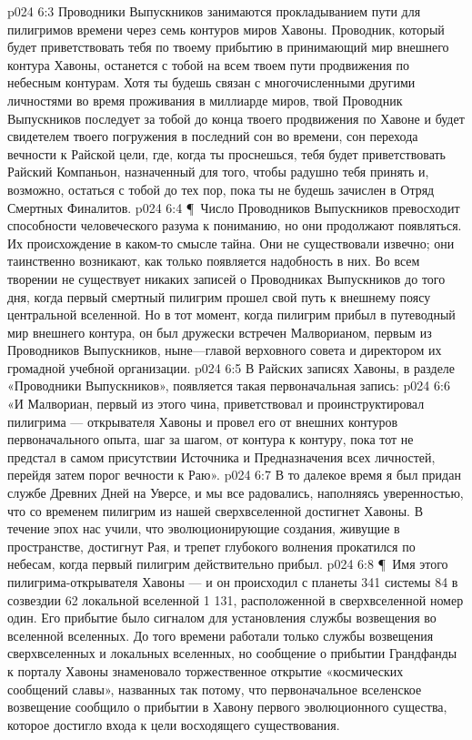 \vs p024 6:3 Проводники Выпускников занимаются прокладыванием пути для пилигримов времени через семь контуров миров Хавоны. Проводник, который будет приветствовать тебя по твоему прибытию в принимающий мир внешнего контура Хавоны, останется с тобой на всем твоем пути продвижения по небесным контурам. Хотя ты будешь связан с многочисленными другими личностями во время проживания в миллиарде миров, твой Проводник Выпускников последует за тобой до конца твоего продвижения по Хавоне и будет свидетелем твоего погружения в последний сон во времени, сон перехода вечности к Райской цели, где, когда ты проснешься, тебя будет приветствовать Райский Компаньон, назначенный для того, чтобы радушно тебя принять и, возможно, остаться с тобой до тех пор, пока ты не будешь зачислен в Отряд Смертных Финалитов.
\vs p024 6:4 \P\ Число Проводников Выпускников превосходит способности человеческого разума к пониманию, но они продолжают появляться. Их происхождение в каком\hyp{}то смысле тайна. Они не существовали извечно; они таинственно возникают, как только появляется надобность в них. Во всем творении не существует никаких записей о Проводниках Выпускников до того дня, когда первый смертный пилигрим прошел свой путь к внешнему поясу центральной вселенной. Но в тот момент, когда пилигрим прибыл в путеводный мир внешнего контура, он был дружески встречен Малворианом, первым из Проводников Выпускников, ныне---главой верховного совета и директором их громадной учебной организации.
\vs p024 6:5 В Райских записях Хавоны, в разделе «Проводники Выпускников», появляется такая первоначальная запись:
\vs p024 6:6 «И Малвориан, первый из этого чина, приветствовал и проинструктировал пилигрима --- открывателя Хавоны и провел его от внешних контуров первоначального опыта, шаг за шагом, от контура к контуру, пока тот не предстал в самом присутствии Источника и Предназначения всех личностей, перейдя затем порог вечности к Раю».
\vs p024 6:7 В то далекое время я был придан службе Древних Дней на Уверсе, и мы все радовались, наполняясь уверенностью, что со временем пилигрим из нашей сверхвселенной достигнет Хавоны. В течение эпох нас учили, что эволюционирующие создания, живущие в пространстве, достигнут Рая, и трепет глубокого волнения прокатился по небесам, когда первый пилигрим действительно прибыл.
\vs p024 6:8 \P\ Имя этого пилигрима\hyp{}открывателя Хавоны ---  и он происходил с планеты 341 системы 84 в созвездии 62 локальной вселенной 1 131, расположенной в сверхвселенной номер один. Его прибытие было сигналом для установления службы возвещения во вселенной вселенных. До того времени работали только службы возвещения сверхвселенных и локальных вселенных, но сообщение о прибытии Грандфанды к порталу Хавоны знаменовало торжественное открытие «космических сообщений славы», названных так потому, что первоначальное вселенское возвещение сообщило о прибытии в Хавону первого эволюционного существа, которое достигло входа к цели восходящего существования.
